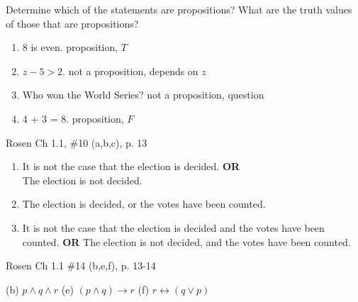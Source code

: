 \documentclass[12pt,addpoints]{exam}
\newcommand{\ra}{\rightarrow}
\newcommand{\lra}{\leftrightarrow}
\begin{document}
\begin{questions}
\printanswers

\question[4] Determine which of the statements are propositions? What are the truth values of those that are propositions?
    \ifprintanswers
        \vspace{-15pt}
    \fi
    \begin{solution}
        \begin{enumerate}[label=(\alph*),itemsep=0pt,parsep=0pt,
        topsep=0pt,partopsep=0pt]
        	\item 8 is even. \hspace{1.6in} proposition, $T$
        	\item $z - 5 > 2$. \hspace{1.55in} not a proposition, depends on $z$
        	\item Who won the World Series? \hspace{0.27in} not a proposition, question
        	\item 4 + 3 = 8. \hspace{1.5in} proposition, $F$
        \end{enumerate}
    \end{solution}


\question[9] Rosen Ch 1.1, \#10 (a,b,c), p. 13 
	\ifprintanswers
        \vspace{-15pt}
    \fi
    \begin{solution}
    	\begin{enumerate}[label=(\alph*),itemsep=0pt,parsep=0pt,
    	topsep=0pt,partopsep=0pt]
    		\item It is not the case that the election is decided. \textbf{OR} \\The election is not decided.
    		\item The election is decided, or the votes have been counted.
    		\item It is not the case that the election is decided and the votes have been counted. \textbf{OR} The election is not decided, and the votes have been counted.
    	\end{enumerate}
    \end{solution}


\question[6] Rosen Ch 1.1 \#14 (b,e,f), p. 13-14
    \ifprintanswers
        \vspace{-15pt}
    \fi
    \begin{solution}
    	(b) $p \wedge q \wedge r$ \hfill (e) $(p \wedge q) \ra r$ \hfill (f) $r \lra (q \vee p)$
    \end{solution}
    


\end{questions}
\end{document}
